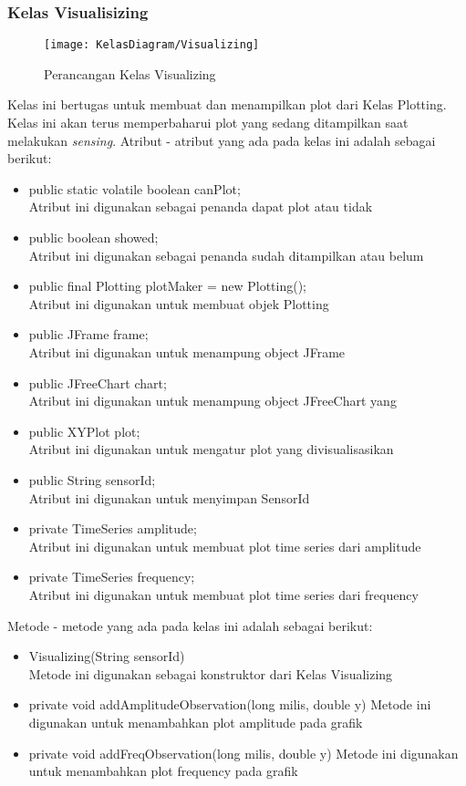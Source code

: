 \subsubsection{Kelas Visualisizing}
\begin{figure}[H]
	\centering
	\texttt{[image: KelasDiagram/Visualizing]}  
	\caption[Perancangan Kelas Visualizing]{Perancangan Kelas Visualizing} 
	\label{fig:KelasVisualizing} 
\end{figure}
Kelas ini bertugas untuk membuat dan menampilkan plot dari Kelas Plotting. Kelas ini akan terus memperbaharui plot yang sedang ditampilkan saat melakukan {\it sensing}. Atribut - atribut yang ada pada kelas ini adalah sebagai berikut:
\begin{itemize}
	\item public static volatile boolean canPlot; \\
		Atribut ini digunakan sebagai penanda dapat plot atau tidak
	\item public boolean showed; \\
		Atribut ini digunakan sebagai penanda sudah ditampilkan atau belum
	\item public final Plotting plotMaker = new Plotting(); \\
		Atribut ini digunakan untuk membuat objek Plotting 
	\item public JFrame frame;\\
		Atribut ini digunakan untuk menampung object JFrame
	\item public JFreeChart chart; \\
		Atribut ini digunakan untuk menampung object JFreeChart yang 
	\item public XYPlot plot; \\
		Atribut ini digunakan untuk mengatur plot yang divisualisasikan
	\item public String sensorId; \\
		Atribut ini digunakan untuk menyimpan SensorId 
	\item private TimeSeries amplitude; \\
		Atribut ini digunakan untuk membuat plot time series dari amplitude
	\item private TimeSeries frequency; \\
		Atribut ini digunakan untuk membuat plot time series dari frequency
\end{itemize}
Metode - metode yang ada pada kelas ini adalah sebagai berikut:
\begin{itemize}
	\item Visualizing(String sensorId) \\
		Metode ini digunakan sebagai konstruktor dari Kelas Visualizing
	\item private void addAmplitudeObservation(long milis, double y)
		Metode ini digunakan untuk menambahkan plot amplitude pada grafik
	\item private void addFreqObservation(long milis, double y) 
		Metode ini digunakan untuk menambahkan plot frequency pada grafik
\end{itemize}
